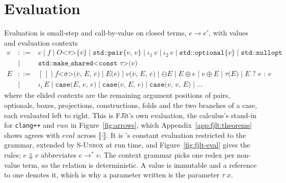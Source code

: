 \section{Evaluation}
\label{app:fjlt:evaluation}

Evaluation is small-step and call-by-value on closed terms, $e \longrightarrow e'$, with values and evaluation contexts
\[
\begin{array}{rcl}
v &::=& c \mid f \mid O\texttt{<}\overline{\tau}\texttt{>\{}\overline{v}\texttt{\}} \mid \texttt{std::pair\{}v\texttt{, }v\texttt{\}} \mid \iota_1\,v \mid \iota_2\,v \mid \texttt{std::optional\{}v\texttt{\}} \mid \texttt{std::nullopt} \\
  &\mid& \texttt{std::make\_shared<const }\tau\texttt{>(}v\texttt{)} \\
E &::=& [\,] \mid f\texttt{<}\overline{\sigma}\texttt{>(}\overline{v}\texttt{, }E\texttt{, }\overline{e}\texttt{)} \mid E\texttt{(}\overline{e}\texttt{)} \mid v\texttt{(}\overline{v}\texttt{, }E\texttt{, }\overline{e}\texttt{)} \mid \ominus E \mid E \oplus e \mid v \oplus E \mid \tau\texttt{(}E\texttt{)} \mid E \texttt{ ? } e \texttt{ : } e \\
  &\mid& \iota_i\,E \mid \texttt{case(}E\texttt{, }e\texttt{, }e\texttt{)} \mid \texttt{case(}v\texttt{, }E\texttt{, }e\texttt{)} \mid \texttt{case(}v\texttt{, }v\texttt{, }E\texttt{)} \mid \ldots
\end{array}
\]
where the elided contexts are the remaining argument positions of pairs, optionals, boxes, projections, constructions, folds and the two branches of a case, each evaluated left to right.
This is FJlt's own evaluation, the calculus's stand-in for \texttt{clang++} and $\mathit{run}$ in Figure~\ref{fig:arrows}, which Appendix~\ref{app:fjlt:theorems} shows agrees with $\mathit{eval}$ across $\llbracket\cdot\rrbracket$.
It is \Cpp{}'s constant evaluation restricted to the grammar, extended by \textsc{S-Unbox} at run time, and Figure~\ref{fig:fjlt-eval} gives the rules; $e \Downarrow v$ abbreviates $e \longrightarrow^{*} v$.
The context grammar picks one redex per non-value term, so the relation is deterministic.
A value is immutable and a reference to one denotes it, which is why a parameter written  is the parameter $\tau\; x$.

